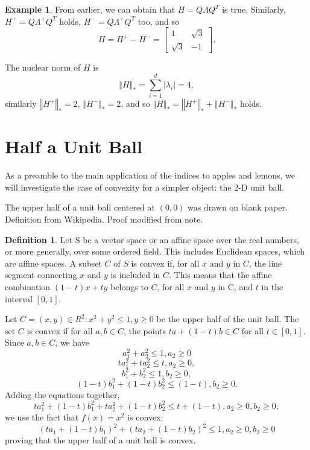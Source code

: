 \documentclass[12pt]{article}
\numberwithin{equation}{section}
\numberwithin{figure}{section}
\numberwithin{table}{section}
\theoremstyle{definition}
\newtheorem{definition}{Definition}[section]
\newtheorem{example}{Example}[section]
\theoremstyle{remark}
\numberwithin{equation}{section}
\begin{document}
\begin{example}
From earlier, we can obtain that $H = Q\Lambda Q^{T}$ is true. Similarly, $H^{+} = Q \Lambda^{+} Q^{T}$ holds,  $H^{-} = Q \Lambda^{+} Q^{T} $ too, and so
\[
H = H^{+} - H^{-}= \begin{bmatrix}
							1 & \sqrt{3}  \\
							\sqrt{3} & -1
							\end{bmatrix}.
\]

The nuclear norm of $H$ is 
\[
\left\Vert H \right\Vert_{*} = \sum_{i=1}^{d} |\lambda_{i}| = 4, 
\]
similarly $\left\Vert H^{+} \right\Vert_{*} = 2$, $\left\Vert H^{-} \right\Vert_{*} = 2$, and so $\left\Vert H \right\Vert_{*} = \left\Vert H^{+} \right\Vert_{*} + \left\Vert H^{-} \right\Vert_{*}$ holds.

\end{example}



\section{Half a Unit Ball}
\label{houb}

As a preamble to the main application of the indices to apples and lemons, we will investigate the case of convexity for a simpler object: the 2-D unit ball.

The upper half of a unit ball centered at $(0, 0)$ was drawn on blank paper. Definition from Wikipedia. Proof modified from note.
\begin{definition}
	Let S be a vector space or an affine space over the real numbers, or more generally, over some ordered field. This includes Euclidean spaces, which are affine spaces. A subset $C$ of $S$ is convex if, for all $x$ and $y$ in $C$, the line segment connecting $x$ and $y$ is included in $C$. This means that the affine combination $(1-t)x + ty$ belongs to $C$, for all $x$ and $y$ in C, and $t$ in the interval $[0, 1]$.
\end{definition}

Let $C = {(x, y) \in R^{2}: x^{2} + y^{2} \leq 1, y \geq 0}$ be the upper half of the unit ball. The set $C$ is convex if for all $a, b \in C$, the points $ta + (1 - t)b \in C$ for all $t \in [0, 1]$. Since $a, b \in C$, we have
\[
a_{1}^{2} + a_{2}^{2} \leq 1, a_{2} \geq 0
\]
\[
ta_{1}^{2} + ta_{2}^{2} \leq t, a_{2} \geq 0,
\]
\[
b_{1}^{2} + b_{2}^{2} \leq 1, b_{2} \geq 0,
\]
\[
(1 - t)b_{1}^{2} + (1 - t)b_{2}^{2} \leq (1 - t), b_{2} \geq 0.
\]
Adding the equations together,
\[
ta_{1}^{2} + (1 - t)b_{1}^{2} + ta_{2}^{2} + (1 - t)b_{2}^{2} \leq t + (1 - t), a_{2} \geq 0, b_{2} \geq 0,
\]
we use the fact that $f(x) = x^{2}$ is convex:
\[
(ta_{1} + (1 - t)b_{1})^{2} + (ta_{2} +  (1 - t)b_{2})^{2} \leq 1, a_{2} \geq 0, b_{2} \geq 0
\]
proving that the upper half of a unit ball is convex.
\end{document}
